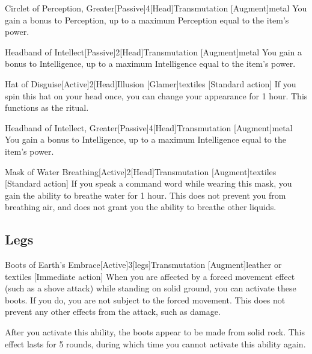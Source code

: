             \begin{magicitemdef}{Circlet of Perception, Greater}[Passive]{4}[Head]{Transmutation [Augment]}{metal}
                 You gain a  bonus to Perception, up to a maximum Perception equal to the item's power.
            \end{magicitemdef}

            \begin{magicitemdef}{Headband of Intellect}[Passive]{2}[Head]{Transmutation [Augment]}{metal}
                 You gain a  bonus to Intelligence, up to a maximum Intelligence equal to the item's power.
            \end{magicitemdef}

            \begin{magicitemdef}{Hat of Disguise}[Active]{2}[Head]{Illusion [Glamer]}{textiles}
                [Standard action] If you spin this hat on your head once, you can change your appearance for 1 hour.
                This functions as the  ritual.
            \end{magicitemdef}

            \begin{magicitemdef}{Headband of Intellect, Greater}[Passive]{4}[Head]{Transmutation [Augment]}{metal}
                 You gain a  bonus to Intelligence, up to a maximum Intelligence equal to the item's power.
            \end{magicitemdef}

            \begin{magicitemdef}{Mask of Water Breathing}[Active]{2}[Head]{Transmutation [Augment]}{textiles}
                [Standard action] If you speak a command word while wearing this mask, you gain the ability to breathe water for 1 hour.
                This does not prevent you from breathing air, and does not grant you the ability to breathe other liquids.
            \end{magicitemdef}

        \subsection{Legs}

            \begin{magicitemdef}{Boots of Earth's Embrace}[Active]{3}[legs]{Transmutation [Augment]}{leather or textiles}
                [Immediate action] When you are affected by a forced movement effect (such as a shove attack) while standing on solid ground, you can activate these boots.
                If you do, you are not subject to the forced movement.
                This does not prevent any other effects from the attack, such as damage.

                After you activate this ability, the boots appear to be made from solid rock.
                This effect lasts for 5 rounds, during which time you cannot activate this ability again.
            \end{magicitemdef}

